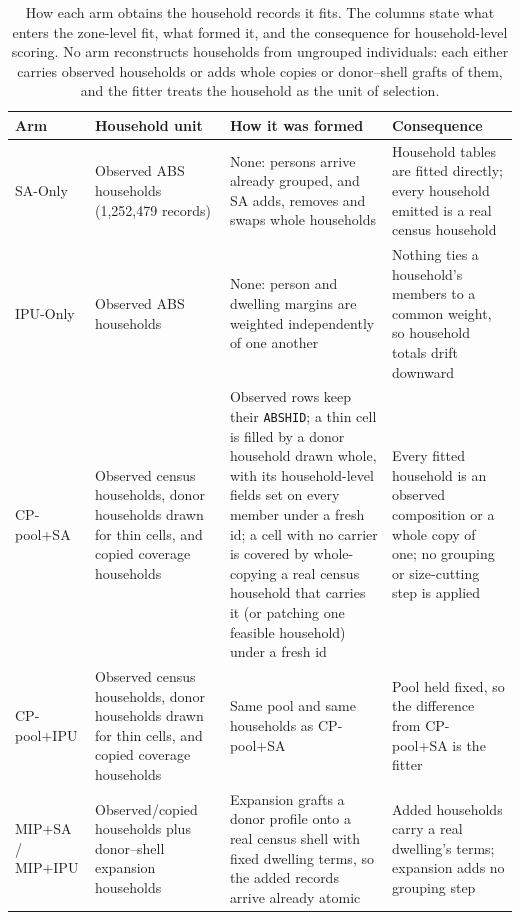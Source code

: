 \documentclass[review]{elsarticle}
\begin{document}
\begin{table}[h!]
\centering
\caption{How each arm obtains the household records it fits. The columns
state what enters the zone-level fit, what formed it, and the consequence for
household-level scoring. No arm reconstructs households from ungrouped
individuals: each either carries observed households or adds whole copies or
donor--shell grafts of them, and the fitter treats the household as the unit of
selection.}
\label{tab:hh_handling}
\footnotesize
\setlength{\tabcolsep}{4pt}
\renewcommand{\arraystretch}{1.1}
\begin{tabular}{@{}>{\raggedright\arraybackslash}p{2.1cm}
                     >{\raggedright\arraybackslash}p{3.4cm}
                     >{\raggedright\arraybackslash}p{5.2cm}
                     >{\raggedright\arraybackslash}p{3.2cm}@{}}
\toprule
\textbf{Arm} & \textbf{Household unit} & \textbf{How it was formed} & \textbf{Consequence} \\
\midrule
SA-Only & Observed ABS households (1{,}252{,}479 records) & None: persons arrive already grouped, and SA adds, removes and swaps whole households & Household tables are fitted directly; every household emitted is a real census household \\
IPU-Only & Observed ABS households & None: person and dwelling margins are weighted independently of one another & Nothing ties a household's members to a common weight, so household totals drift downward \\
CP-pool+SA & Observed census households, donor households drawn for thin cells, and copied coverage households & Observed rows keep their \texttt{ABSHID}; a thin cell is filled by a donor household drawn whole, with its household-level fields set on every member under a fresh id; a cell with no carrier is covered by whole-copying a real census household that carries it (or patching one feasible household) under a fresh id & Every fitted household is an observed composition or a whole copy of one; no grouping or size-cutting step is applied \\
CP-pool+IPU & Observed census households, donor households drawn for thin cells, and copied coverage households & Same pool and same households as CP-pool+SA & Pool held fixed, so the difference from CP-pool+SA is the fitter \\
MIP+SA / MIP+IPU & Observed/copied households plus donor--shell expansion households & Expansion grafts a donor profile onto a real census shell with fixed dwelling terms, so the added records arrive already atomic & Added households carry a real dwelling's terms; expansion adds no grouping step \\
\bottomrule
\end{tabular}
\end{table}
\end{document}
